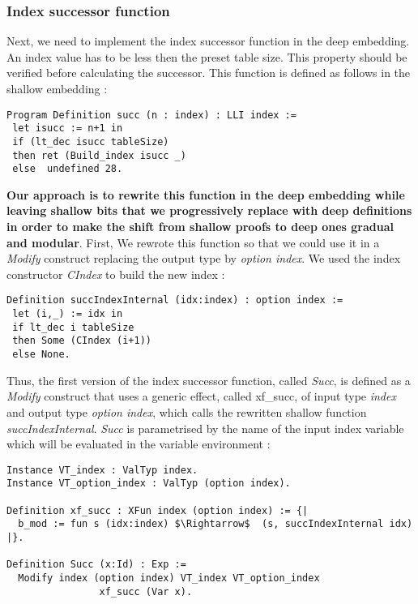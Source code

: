\subsubsection{Index successor function}
Next, we need to implement the index successor function in the deep embedding. An index value has to be less then the preset table size. This property should be verified before calculating the successor. This function is defined as follows in the shallow embedding :
\begin{lstlisting}[caption = {Index successor function in the shallow embedding},xleftmargin=.04\textwidth,
xrightmargin=.04\textwidth,label={indexShal}]
Program Definition succ (n : index) : LLI index :=
 let isucc := n+1 in
 if (lt_dec isucc tableSize)
 then ret (Build_index isucc _)
 else  undefined 28.
\end{lstlisting} \vspace{4pt}
\textbf{Our approach is to rewrite this function in the deep embedding while leaving shallow bits that we progressively replace with deep definitions in order to make the shift from shallow proofs to deep ones gradual and modular}. First, We rewrote this function so that we could use it in a \textit{Modify} construct replacing the output type by \textit{option index}. We used the index constructor \textit{CIndex} to build the new index : 
\begin{lstlisting}[caption={Rewritten shallow index successor function},xleftmargin=-.01\textwidth,
xrightmargin=-.01\textwidth,label={succInt}]
Definition succIndexInternal (idx:index) : option index :=
 let (i,_) := idx in 
 if lt_dec i tableSize 
 then Some (CIndex (i+1)) 
 else None.
\end{lstlisting} \vspace{4pt}
Thus, the first version of the index successor function, called \textit{Succ}, is defined as a \textit{Modify} construct that uses a generic effect, called xf\_succ, of input type \textit{index} and output type \textit{option index}, which calls the rewritten shallow function \textit{succIndexInternal}. \textit{Succ} is parametrised by the name of the input index variable which will be evaluated in the variable environment : 
\begin{lstlisting}[caption = {Definition of Succ},xleftmargin=-.02\textwidth,
xrightmargin=-.02\textwidth, mathescape=true,label={SuccFn}]
Instance VT_index : ValTyp index.
Instance VT_option_index : ValTyp (option index).

Definition xf_succ : XFun index (option index) := {|
  b_mod := fun s (idx:index) $\Rightarrow$  (s, succIndexInternal idx)
|}.

Definition Succ (x:Id) : Exp :=
  Modify index (option index) VT_index VT_option_index 
  	            xf_succ (Var x).
\end{lstlisting} \vspace{4pt}

